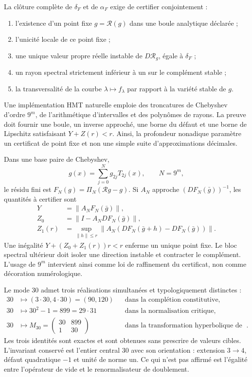 La clôture complète de \(\delta_F\) et de \(\alpha_F\) exige de certifier conjointement :

\begin{enumerate}
\item l’existence d’un point fixe \(g=\mathcal R(g)\) dans une boule analytique déclarée ;
\item l’unicité locale de ce point fixe ;
\item une unique valeur propre réelle instable de \(D\mathcal R_g\), égale à \(\delta_F\) ;
\item un rayon spectral strictement inférieur à un sur le complément stable ;
\item la transversalité de la courbe \(\lambda\mapsto f_\lambda\) par rapport à la variété stable de \(g\).
\end{enumerate}

Une implémentation HMT naturelle emploie des troncatures de Chebyshev d’ordre
\(9^m\), de l’arithmétique d’intervalles et des polynômes de rayons. La preuve doit
fournir une boule, un inverse approché, une borne du défaut et une borne
de Lipschitz satisfaisant \(Y+Z(r)<r\). Ainsi, la profondeur
nonadique paramètre un certificat de point fixe et non une simple suite
d’approximations décimales.

Dans une base paire de Chebyshev,
\[
g(x)=\sum_{j=0}^{N}g_{2j}T_{2j}(x),\qquad N=9^m,
\]
le résidu fini est \(F_N(g)=\Pi_N(\mathcal Rg-g)\). Si \(A_N\) approche
\((DF_N(\bar g))^{-1}\), les quantités à certifier sont
\begin{align*}
Y&=\|A_NF_N(\bar g)\|,\\
Z_0&=\|I-A_NDF_N(\bar g)\|,\\
Z_1(r)&=\sup_{\|h\|\le r}
\|A_N(DF_N(\bar g+h)-DF_N(\bar g))\|.
\end{align*}
Une inégalité
\(Y+(Z_0+Z_1(r))r<r\) enferme un unique point fixe. Le bloc spectral
ultérieur doit isoler une direction instable et contracter le complément. L’usage
de \(9^m\) intervient ainsi comme loi de raffinement du certificat, non comme
décoration numérologique.

\begin{corollary}
Le mode \(30\) admet trois réalisations simultanées et typologiquement
distinctes :
\begin{align*}
30&\longmapsto(3\cdot30,4\cdot30)=(90,120)
&&\text{dans la complétion constitutive},\\
30&\longmapsto30^2-1=899=29\cdot31
&&\text{dans la normalisation critique},\\
30&\longmapsto
M_{30}=\begin{pmatrix}30&899\\1&30\end{pmatrix}
&&\text{dans la transformation hyperbolique de Pell}.
\end{align*}
Les trois identités sont exactes et sont obtenues sans prescrire de valeurs cibles. L’invariant conservé est
l’entier central \(30\) avec son orientation : extension \(3\to4\),
défaut quadratique \(-1\) et unité de norme un. Ce qui n’est pas affirmé est
l’égalité entre l’opérateur de vide et le renormalisateur de doublement.
\end{corollary}

